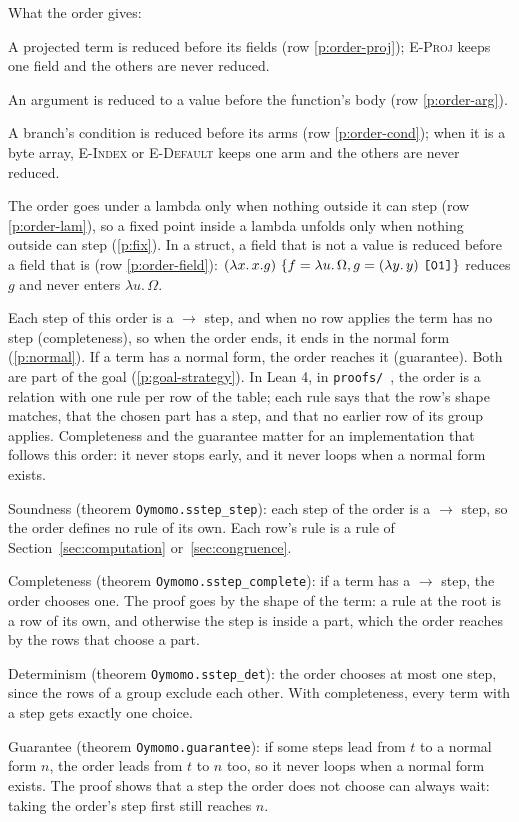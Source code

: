 \documentclass[11pt,letterpaper]{article}
\newcommand{\step}{\mathrel{\longrightarrow}}     %
\newcommand{\lam}[2]{\lambda #1.\,#2}       %
\newcommand{\rn}[1]{\textsc{#1}}                %
\newcommand{\hex}[1]{\text{\ttfamily [#1]}}  %
\newcommand{\pref}[1]{\ref{#1}}  %
\begin{document}
\begin{points}
\[\]
\item What the order gives:
  \begin{subpoints}
  \item A projected term is reduced before its fields (row \pref{p:order-proj}); \rn{E-Proj} keeps one
    field and the others are never reduced.
  \item An argument is reduced to a value before the function's body (row \pref{p:order-arg}).
  \item A branch's condition is reduced before its arms (row \pref{p:order-cond}); when it is a byte array,
    \rn{E-Index} or \rn{E-Default} keeps one arm and the others are never reduced.
  \item The order goes under a lambda only when nothing outside it can step (row \pref{p:order-lam}), so a fixed point inside a lambda unfolds only
    when nothing outside can step (\pref{p:fix}). In a
    struct, a field that is not a value is reduced before a field that is (row \pref{p:order-field}):
    $(\lam{x}{x.g})\ \{f = \lam{u}{\Omega}, g = (\lam{y}{y})\ \hex{01}\}$ reduces $g$ and never enters $\lam{u}{\Omega}$.
  \end{subpoints}
\item Each step of this order is a $\step$ step, and when no row applies the term has no step
  (completeness), so when the order ends, it ends in the normal form (\pref{p:normal}). If a term has a
  normal form, the order reaches it (guarantee). Both are part of the goal (\pref{p:goal-strategy}). In Lean 4, in \texttt{proofs/}~\cite{oymoproofs}, the order is a relation with one rule per row of the table;
  each rule says that the row's shape matches, that the chosen part has a step, and that no
  earlier row of its group applies. Completeness and the guarantee matter for an implementation that follows
  this order: it never stops early, and it never loops when a normal form exists.
  \begin{subpoints}
  \item Soundness (theorem \texttt{Oymomo.sstep\_step}): each step of the order is a $\step$ step, so the
    order defines no rule of its own. Each row's rule is a rule of Section~\ref{sec:computation} or~\ref{sec:congruence}.
  \item Completeness (theorem \texttt{Oymomo.sstep\_complete}): if a term has a $\step$ step, the order chooses
    one. The proof goes by the shape of the term: a rule at the root is a row of its own, and
    otherwise the step is inside a part, which the order reaches by the rows that choose a part.
  \item Determinism (theorem \texttt{Oymomo.sstep\_det}): the order chooses at most one step, since the rows of
    a group exclude each other. With completeness, every term with a step gets exactly one choice.
  \item Guarantee (theorem \texttt{Oymomo.guarantee}): if some steps lead from $t$ to a normal form $n$,
    the order leads from $t$ to $n$ too, so it never loops when a normal form exists. The proof shows that a
    step the order does not choose can always wait: taking the order's step first still reaches $n$.
  \end{subpoints}
\end{points}
\end{document}
